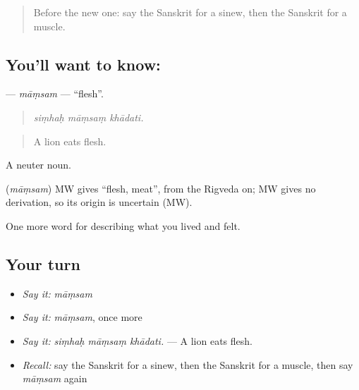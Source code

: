 \label{lesson:SA-C474-mamsam}



\begin{quote}
Before the new one: say the Sanskrit for a sinew, then the Sanskrit for a muscle.
\end{quote}

\subsection*{You'll want to know: }
\textbf{} — \emph{māṃsam} — \textquotedblleft{}flesh\textquotedblright{}.

\begin{quote}
  
\end{quote}

\begin{quote}
\emph{siṃhaḥ māṃsaṃ khādati.}
\end{quote}

\begin{quote}
A lion eats flesh.
\end{quote}

A neuter noun.

\begin{cousinweb}
\textbf{} (\emph{māṃsam}) MW gives \textquotedblleft{}flesh, meat\textquotedblright{}, from the Rigveda on; MW gives no derivation, so its origin is uncertain (MW).
\end{cousinweb}

\begin{grammarlens}[title={What you've built}]
One more word for describing what you lived and felt.
\end{grammarlens}

\subsection*{Your turn}
\begin{itemize}
\raggedright
  \item \emph{Say it:} \emph{māṃsam}
  \item \emph{Say it:} \emph{māṃsam}, once more
  \item \emph{Say it:} \emph{siṃhaḥ māṃsaṃ khādati.} — A lion eats flesh.
  \item \emph{Recall:} say the Sanskrit for a sinew, then the Sanskrit for a muscle, then say \emph{māṃsam} again
\end{itemize}

